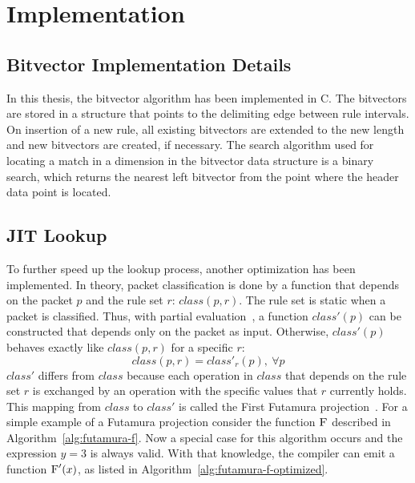 \documentclass[conference]{IEEEtran}
\begin{document}

\section{Implementation}
\subsection{Bitvector Implementation Details}
In this thesis, the bitvector algorithm has been implemented in C.
The bitvectors are stored in a structure that points to the delimiting edge
between rule intervals.
On insertion of a new rule, all existing bitvectors are extended to the new length and new bitvectors 
are created, if necessary.
The search algorithm used for locating a match in a dimension in the bitvector 
data structure is a binary search, which returns the nearest left bitvector from the point where 
the header data point is located.

\subsection{JIT Lookup}
To further speed up the lookup process, another optimization has been implemented.
In theory, packet classification is done by a function that depends on the packet $p$ and the rule set $r$: $class(p, r)$.
The rule set is static when a packet is classified.
Thus, with partial evaluation~\cite{partial_eval}, a function $class'(p)$ can be constructed that depends only on the packet as input.
Otherwise, $class'(p)$ behaves exactly like $class(p, r)$ for a specific $r$:
$$class(p, r) = class'_r(p),\ \forall p$$
$class'$ differs from $class$ because each operation in $class$ that depends on the 
rule set $r$ is exchanged by an operation with the specific values that $r$ currently holds.
This mapping from $class$ to $class'$ is called the First Futamura projection~\cite{DBLP:journals/ngc/MogensenH88}.
For a simple example of a Futamura projection consider the function $\textsc{F}$ described in Algorithm~\ref{alg:futamura-f}.
Now a special case for this algorithm occurs and the expression $y = 3$ is always valid.
With that knowledge, the compiler can emit a function $\textsc{F}'(x)$, as listed in Algorithm~\ref{alg:futamura-f-optimized}.
\end{document}
